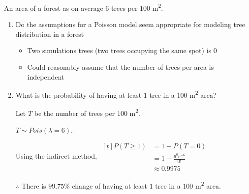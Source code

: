 \begin{example}
    An area of a forest as on average $6$ trees per $100$ m\textsuperscript{2}. 

    \begin{enumerate}[label=\alph*)]
        \item Do the assumptions for a Poisson model seem appropriate for modeling tree distribution in a forest
        
        \begin{itemize}
            \item Two simulations trees (two trees occupying the same spot) is $0$
            \item Could reasonably assume that the number of trees per area is independent
        \end{itemize}

        \item What is the probability of having at least $1$ tree in a $100$ m\textsuperscript{2} area? 
        
        Let $T$ be the number of trees per $100$ m\textsuperscript{2}. 

        $T \sim Pois(\lambda = 6)$. 

        Using the indirect method, $\begin{aligned}[t]
            P(T \ge 1) & = 1 - P(T = 0)              \\
                       & = 1 - \frac{6^0 e^{-6}}{0!} \\
                       & \approx 0.9975
        \end{aligned}$

        $\therefore$ There is $99.75\%$ change of having at least $1$ tree in a $100$ m\textsuperscript{2} area. 
    \end{enumerate}
\end{example}

